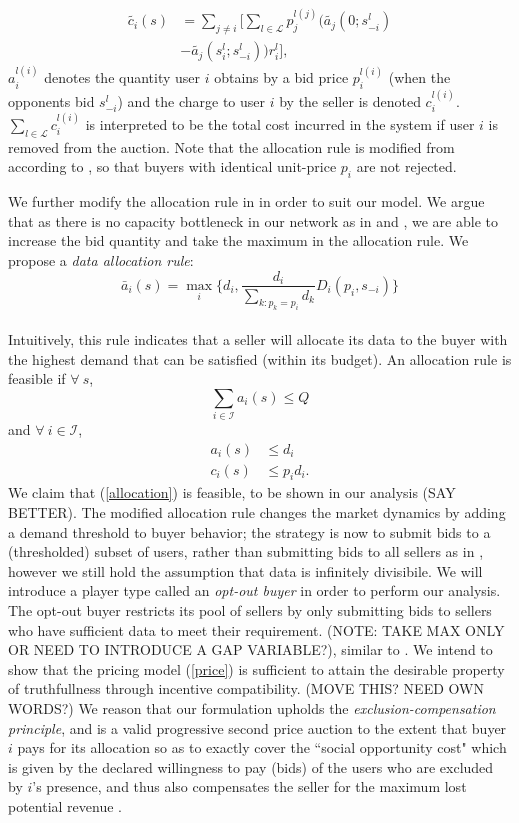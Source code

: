 \documentclass[12pt]{article}
\theoremstyle{definition}
\newcommand{\mcL}{\mathcal{L}}
\newcommand{\mcI}{\mathcal{I}}
\begin{document}
\begin{multicols}{2}
\begin{align*}
    \tilde{c_i}(s) &= \displaystyle\sum_{j\ne i}\bigg\lbrack\sum_{l\in\mcL}
p_j^{l(j)} \bigg(\tilde{a_j}(0; s_{-i}^l)\\
    &-\tilde{a_j}(s_i^l;s_{-i}^l)\bigg) r_i^l\bigg\rbrack,
\end{align*}
 $a_i^{l(i)}$ denotes the quantity user $i$ obtains by a bid price
$p_i^{l(i)}$ (when the
opponents bid $s_{−i}^l$) and the charge to user $i$ by the seller is denoted
$c_i^{l(i)}$. $\sum_{l\in\mcL} c_i^{l(i)}$ is interpreted to be the total cost incurred in the system if
user $i$ is removed from the auction. Note that the allocation rule is modified
from \cite{lazar} according to \cite{tuffin}, so that buyers with identical unit-price
$p_i$ are not rejected.

We further modify the allocation rule in \cite{tuffin} in order to suit our
model. We argue that as there is no capacity bottleneck in our network as in
\cite{lazar} and \cite{semret}, we are able to increase the bid quantity and
take the maximum in the allocation rule. 
We propose a \emph{data allocation rule}:
{
\begin{equation}\label{allocation}
    \bar{a}_i(s) = \max_i\big\lbrace d_i, \frac{d_i}{\sum_{k:p_k= p_i}d_k}
D_i(p_i,s_{-i})\big\rbrace
\end{equation}
} \\
Intuitively, this rule indicates that a seller will allocate its data to the
buyer with the highest demand that can be satisfied (within its budget). 
An allocation rule is feasible \cite{lazar} if $\forall \ s$,
$$
    \displaystyle\sum_{i\in\mcI} a_i(s) \le Q
$$
and $\forall \ i\in\mcI$,
\begin{align*}
    a_i(s) &\le d_i \\
    c_i(s) &\le p_id_i.
\end{align*}
We claim
that (\ref{allocation}) is feasible, to be shown in our analysis (SAY
BETTER).
The modified allocation rule changes the market
dynamics by adding a demand threshold to buyer behavior; the strategy is now to
submit bids to a (thresholded) subset of users, rather than submitting bids to all sellers as in \cite{lazar}, however
we still hold the assumption that data is infinitely divisibile. 
We will introduce a player type called an \emph{opt-out buyer} in order to perform our analysis. The
opt-out buyer restricts its pool of sellers by only submitting bids to sellers
who have sufficient data to meet their requirement.
(NOTE: TAKE MAX ONLY OR NEED TO INTRODUCE
A GAP VARIABLE?), similar to \cite{zheng}. 
We intend to show that the pricing model (\ref{price}) is sufficient to attain the desirable
property of truthfullness through incentive compatibility. (MOVE THIS? NEED OWN
WORDS?) We
reason that our formulation upholds the \emph{exclusion-compensation
principle}, and is a valid progressive second price auction to the extent that buyer $i$
pays for its allocation so as to exactly cover the ``social opportunity cost" which is given by the declared willingness to pay (bids) of the users who are excluded by $i$'s
presence, and thus also compensates the seller for the maximum lost potential
revenue \cite{lazar}.


\end{multicols}
\end{document}
